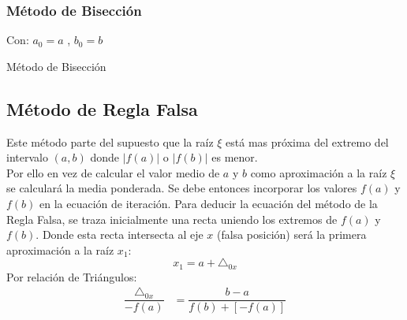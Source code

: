 \subsubsection{Método de Bisección}
\begin{algorithm}[H]
  Con: 
  $a_0=a$ ,
  $b_0=b$\\
 \caption{Método de Bisección}
\end{algorithm}

\subsection{Método de Regla Falsa}
Este método parte del supuesto que la raíz $\xi$ está mas próxima del extremo del intervalo $(a,b)$ donde $|f(a)|$ o $|f(b)|$ es menor.
\\${ }$\\
Por ello en vez de calcular el valor medio de $a$ y $b$ como aproximación a la raíz $\xi$ se calculará la media ponderada. Se debe entonces incorporar los valores $f(a)$ y $f(b)$ en la ecuación de iteración.
\salto
Para deducir la ecuación del método de la Regla Falsa, se traza inicialmente una recta uniendo los  extremos de $f(a)$ y $f(b)$. Donde esta recta intersecta al eje $x$ (falsa posición) será la primera aproximación a la raíz $x_1$:
$$x_1 = a + \triangle_{0x}$$
Por relación de Triángulos:
\begin{align*}
\dfrac{\triangle_{0x}}{-f(a)} &= \dfrac{b-a}{f(b)+[-f(a)]}
\end{align*}

